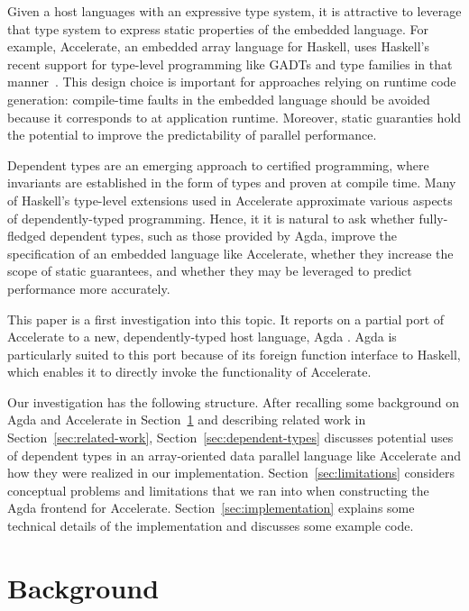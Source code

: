 \documentclass{llncs}
\begin{document}
Given a host languages with an expressive type system, it is
attractive to leverage that type system to express static properties
of the embedded language. For example, Accelerate, an embedded array
language for Haskell, uses Haskell's recent support for type-level
programming like GADTs and type families in that
manner~\cite{ChakravartyKellerLeeMcdonellGrover2011}. This design
choice is important for approaches relying on runtime code generation:
compile-time faults in the embedded language should be avoided because
it corresponds to at application runtime. Moreover, static guaranties
hold the potential to improve the predictability of parallel
performance. 

Dependent types are an emerging approach to certified programming, where invariants are established in the form of types and proven at compile time. Many of Haskell's type-level extensions used in Accelerate approximate various aspects of dependently-typed programming. Hence, it it is natural to ask whether fully-fledged dependent types, such as those provided by Agda, improve the specification of an embedded language like Accelerate, whether they increase the scope of static guarantees, and whether they may be leveraged to predict performance more accurately.

This paper is a first investigation into this topic. It reports on a
partial port of Accelerate to a new, dependently-typed host language,
Agda \cite{Norell2008,BoveDybjerNorell2009}. Agda is particularly
suited to this port because of its foreign function interface to
Haskell, which enables it to directly invoke the functionality of
Accelerate. 

Our investigation has the following structure. After recalling some
background on Agda and Accelerate in Section~\ref{sec:background} and
describing related work in Section~\ref{sec:related-work}, 
Section~\ref{sec:dependent-types} discusses potential uses of
dependent types in an array-oriented data parallel language like
Accelerate and how they were realized in our
implementation. Section~\ref{sec:limitations} considers conceptual 
problems and limitations that we ran into when constructing the Agda
frontend for Accelerate. Section~\ref{sec:implementation} explains
some technical details of the implementation and discusses some
example code. 

\section{Background}
\label{sec:background}
\end{document}
